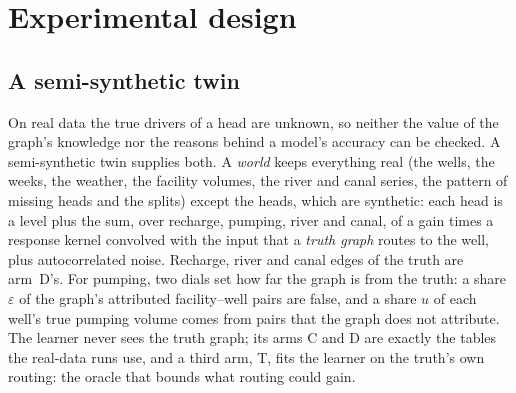 \section{Experimental design}\label{sec:design}

\subsection{A semi-synthetic twin}\label{sec:twin}

On real data the true drivers of a head are unknown, so neither the value of the graph's
knowledge nor the reasons behind a model's accuracy can be checked. A semi-synthetic twin supplies
both. A \emph{world} keeps everything real (the wells, the weeks, the weather, the facility
volumes, the river and canal series, the pattern of missing heads and the splits) except the heads,
which are synthetic: each head is a level plus the sum, over recharge, pumping, river and canal, of
a gain times a response kernel convolved with the input that a \emph{truth graph} routes to the
well, plus autocorrelated noise. Recharge, river and canal edges of the truth are arm~D's. For
pumping, two dials set how far the graph is from the truth: a share $\varepsilon$ of the graph's
attributed facility--well pairs are false, and a share $u$ of each well's true pumping volume
comes from pairs that the graph does not attribute. The learner never sees the truth graph; its
arms C and D are exactly the tables the real-data runs use, and a third arm, T, fits the learner on
the truth's own routing: the oracle that bounds what routing could gain.

